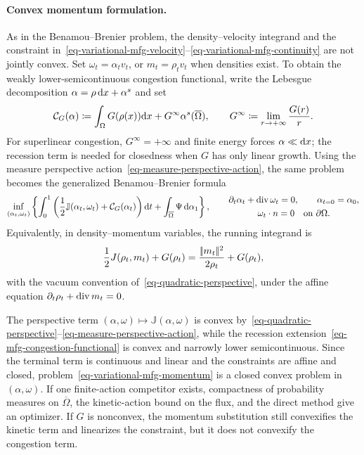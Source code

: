 \paragraph{Convex momentum formulation.}
As in the Benamou--Brenier problem, the density--velocity integrand and the constraint in~\eqref{eq-variational-mfg-velocity}--\eqref{eq-variational-mfg-continuity} are not jointly convex. Set $\omega_t=\alpha_t v_t$, or $m_t=\rho_t v_t$ when densities exist. To obtain the weakly lower-semicontinuous congestion functional, write the Lebesgue decomposition $\alpha=\rho\,\mathrm{d} x+\alpha^s$ and set
\begin{equation}\label{eq-mfg-congestion-functional}
	\mathcal C_G(\alpha)
	\coloneqq
	\int_\Omega G(\rho(x))\mathrm{d} x
		+G^\infty\alpha^s(\overline\Omega),
	\qquad
	G^\infty\coloneqq\lim_{r\to+\infty}\frac{G(r)}r.
\end{equation}
For superlinear congestion, $G^\infty=+\infty$ and finite energy forces $\alpha\ll\mathrm{d} x$; the recession term is needed for closedness when $G$ has only linear growth.
Using the measure perspective action~\eqref{eq-measure-perspective-action}, the same problem becomes the generalized Benamou--Brenier formula
\begin{equation}\label{eq-variational-mfg-momentum}
	\inf_{(\alpha_t,\omega_t)}
	\left\{
		\int_0^1
		\left(
			\frac12\mathbb J(\alpha_t,\omega_t)
			+\mathcal C_G(\alpha_t)
		\right)\mathrm{d} t
		+\int_{\overline\Omega}\Psi\,\mathrm{d}\alpha_1
	\right\},
	\qquad
		\begin{gathered}
			\partial_t\alpha_t+\operatorname{div}\omega_t=0,
			\qquad \alpha_{t=0}=\alpha_0,\\
			\omega_t\cdot n=0\quad\text{on }\partial\Omega.
		\end{gathered}
	\end{equation}
Equivalently, in density--momentum variables, the running integrand is
\begin{equation}\label{eq-variational-mfg-density-momentum}
	\frac12J(\rho_t,m_t)+G(\rho_t)
	=
	\frac{|\!| m_t |\!|^2}{2\rho_t}+G(\rho_t),
\end{equation}
with the vacuum convention of~\eqref{eq-quadratic-perspective}, under the affine equation $\partial_t\rho_t+\operatorname{div} m_t=0$.

The perspective term $(\alpha,\omega)\mapsto\mathbb J(\alpha,\omega)$ is convex by~\eqref{eq-quadratic-perspective}--\eqref{eq-measure-perspective-action}, while the recession extension~\eqref{eq-mfg-congestion-functional} is convex and narrowly lower semicontinuous. Since the terminal term is continuous and linear and the constraints are affine and closed, problem~\eqref{eq-variational-mfg-momentum} is a closed convex problem in $(\alpha,\omega)$. If one finite-action competitor exists, compactness of probability measures on $\overline\Omega$, the kinetic-action bound on the flux, and the direct method give an optimizer. If $G$ is nonconvex, the momentum substitution still convexifies the kinetic term and linearizes the constraint, but it does not convexify the congestion term.

